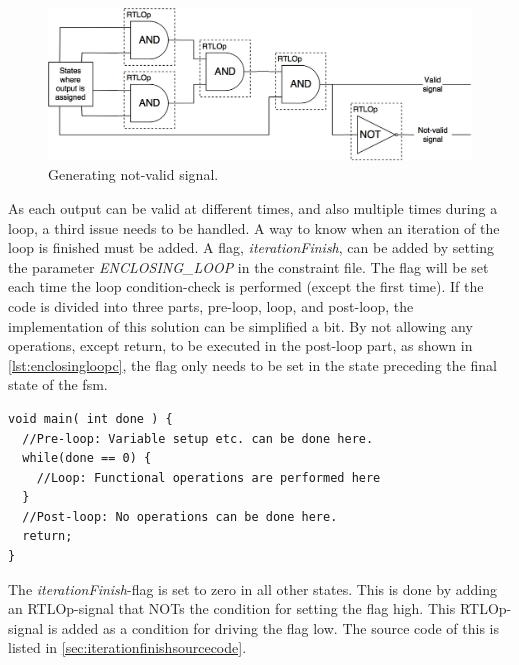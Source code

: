 \begin{figure}[hbpt]
\centering
\includegraphics[width=\textwidth]{../figs/ValidSignals.png}
\caption{\label{fig:validsignals}Generating not-valid signal.}
\end{figure}

As each output can be valid at different times, and also multiple times during a loop, a third issue needs to be handled. A way to know when an iteration of the loop is finished must be added. A flag, \textit{iterationFinish}, can be added by setting the parameter \textit{ENCLOSING\_LOOP} in the constraint file. The flag will be set each time the loop condition-check is performed (except the first time). If the code is divided into three parts, pre-loop, loop, and post-loop, the implementation of this solution can be simplified a bit. By not allowing any operations, except return, to be executed in the post-loop part, as shown in \cref{lst:enclosingloopc}, the flag only needs to be set in the state preceding the final state of the \gls{fsm}.
\lstset{language=C,style=Cstyle}
\begin{lstlisting}[caption={Sectioning of a program with enclosing while-loop},label=lst:enclosingloopc]
void main( int done ) {
  //Pre-loop: Variable setup etc. can be done here.
  while(done == 0) {
    //Loop: Functional operations are performed here
  }
  //Post-loop: No operations can be done here.
  return;
}
\end{lstlisting}
The \textit{iterationFinish}-flag is set to zero in all other states. This is done by adding an RTLOp-signal that NOTs the condition for setting the flag high. This RTLOp-signal is added as a condition for driving the flag low. The source code of this is listed in \cref{sec:iterationfinishsourcecode}.


